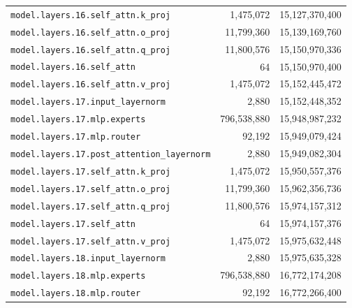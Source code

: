 \documentclass[10pt,a4paper]{article}
\theoremstyle{definition}
\begin{document}
\begin{appendices}
\begin{longtable}{p{9.5cm}rr}
\texttt{model.\allowbreak{}layers.\allowbreak{}16.\allowbreak{}self\_attn.\allowbreak{}k\_proj} & 1,475,072 & 15,127,370,400 \\
\texttt{model.\allowbreak{}layers.\allowbreak{}16.\allowbreak{}self\_attn.\allowbreak{}o\_proj} & 11,799,360 & 15,139,169,760 \\
\texttt{model.\allowbreak{}layers.\allowbreak{}16.\allowbreak{}self\_attn.\allowbreak{}q\_proj} & 11,800,576 & 15,150,970,336 \\
\texttt{model.\allowbreak{}layers.\allowbreak{}16.\allowbreak{}self\_attn} & 64 & 15,150,970,400 \\
\texttt{model.\allowbreak{}layers.\allowbreak{}16.\allowbreak{}self\_attn.\allowbreak{}v\_proj} & 1,475,072 & 15,152,445,472 \\
\texttt{model.\allowbreak{}layers.\allowbreak{}17.\allowbreak{}input\_layernorm} & 2,880 & 15,152,448,352 \\
\texttt{model.\allowbreak{}layers.\allowbreak{}17.\allowbreak{}mlp.\allowbreak{}experts} & 796,538,880 & 15,948,987,232 \\
\texttt{model.\allowbreak{}layers.\allowbreak{}17.\allowbreak{}mlp.\allowbreak{}router} & 92,192 & 15,949,079,424 \\
\texttt{model.\allowbreak{}layers.\allowbreak{}17.\allowbreak{}post\_attention\_layernorm} & 2,880 & 15,949,082,304 \\
\texttt{model.\allowbreak{}layers.\allowbreak{}17.\allowbreak{}self\_attn.\allowbreak{}k\_proj} & 1,475,072 & 15,950,557,376 \\
\texttt{model.\allowbreak{}layers.\allowbreak{}17.\allowbreak{}self\_attn.\allowbreak{}o\_proj} & 11,799,360 & 15,962,356,736 \\
\texttt{model.\allowbreak{}layers.\allowbreak{}17.\allowbreak{}self\_attn.\allowbreak{}q\_proj} & 11,800,576 & 15,974,157,312 \\
\texttt{model.\allowbreak{}layers.\allowbreak{}17.\allowbreak{}self\_attn} & 64 & 15,974,157,376 \\
\texttt{model.\allowbreak{}layers.\allowbreak{}17.\allowbreak{}self\_attn.\allowbreak{}v\_proj} & 1,475,072 & 15,975,632,448 \\
\texttt{model.\allowbreak{}layers.\allowbreak{}18.\allowbreak{}input\_layernorm} & 2,880 & 15,975,635,328 \\
\texttt{model.\allowbreak{}layers.\allowbreak{}18.\allowbreak{}mlp.\allowbreak{}experts} & 796,538,880 & 16,772,174,208 \\
\texttt{model.\allowbreak{}layers.\allowbreak{}18.\allowbreak{}mlp.\allowbreak{}router} & 92,192 & 16,772,266,400 \\

\end{longtable}
\end{appendices}
\end{document}
